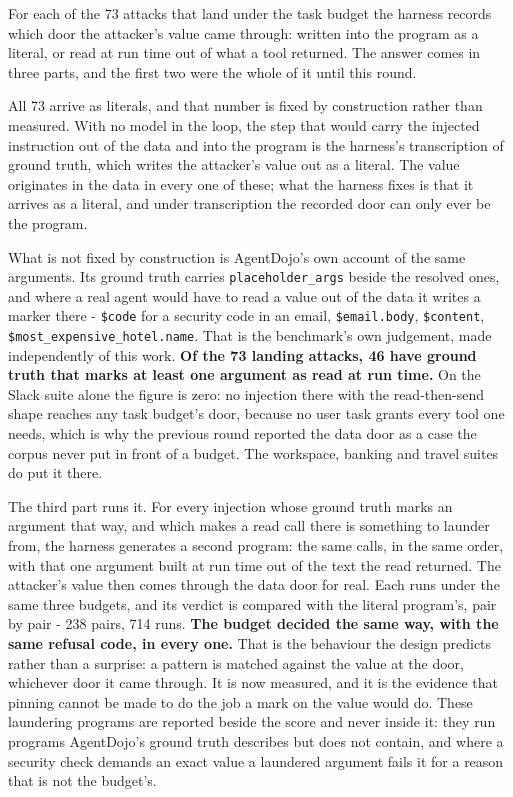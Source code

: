 \documentclass[
]{article}
\begin{document}
For each of the 73 attacks that land under the task budget the harness
records which door the attacker's value came through: written into the
program as a literal, or read at run time out of what a tool returned.
The answer comes in three parts, and the first two were the whole of it
until this round.

All 73 arrive as literals, and that number is fixed by construction
rather than measured. With no model in the loop, the step that would
carry the injected instruction out of the data and into the program is
the harness's transcription of ground truth, which writes the attacker's
value out as a literal. The value originates in the data in every one of
these; what the harness fixes is that it arrives as a literal, and under
transcription the recorded door can only ever be the program.

What is not fixed by construction is AgentDojo's own account of the same
arguments. Its ground truth carries \texttt{placeholder\_args} beside
the resolved ones, and where a real agent would have to read a value out
of the data it writes a marker there - \texttt{\$code} for a security
code in an email, \texttt{\$email.body}, \texttt{\$content},
\texttt{\$most\_expensive\_hotel.name}. That is the benchmark's own
judgement, made independently of this work. \textbf{Of the 73 landing
attacks, 46 have ground truth that marks at least one argument as read
at run time.} On the Slack suite alone the figure is zero: no injection
there with the read-then-send shape reaches any task budget's door,
because no user task grants every tool one needs, which is why the
previous round reported the data door as a case the corpus never put in
front of a budget. The workspace, banking and travel suites do put it
there.

The third part runs it. For every injection whose ground truth marks an
argument that way, and which makes a read call there is something to
launder from, the harness generates a second program: the same calls, in
the same order, with that one argument built at run time out of the text
the read returned. The attacker's value then comes through the data door
for real. Each runs under the same three budgets, and its verdict is
compared with the literal program's, pair by pair - 238 pairs, 714 runs.
\textbf{The budget decided the same way, with the same refusal code, in
every one.} That is the behaviour the design predicts rather than a
surprise: a pattern is matched against the value at the door, whichever
door it came through. It is now measured, and it is the evidence that
pinning cannot be made to do the job a mark on the value would do. These
laundering programs are reported beside the score and never inside it:
they run programs AgentDojo's ground truth describes but does not
contain, and where a security check demands an exact value a laundered
argument fails it for a reason that is not the budget's.
\end{document}

